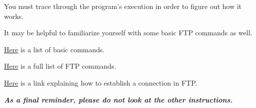 {{{You must trace through the program's execution in order to figure out how it works. %







It may be helpful to familiarize yourself with some basic FTP commands as well. 















                    \href{https://kb.iu.edu/d/aenq}{Here} is a list of basic commands.















                    \href{https://en.wikipedia.org/wiki/List_of_FTP_commands}{Here} is a full list of FTP commands.















                    \href{https://www.serv-u.com/resource/tutorial/pasv-response-epsv-port-pbsz-rein-ftp-command#fac52a38-7ddb-4815-a9dc-72cc03c0a8e6}{Here} is a link explaining how to establish a connection in FTP.















                    \textbf{\textit{As a final reminder, please do not look at the other instructions.}}







            }







        \newpage







}}
